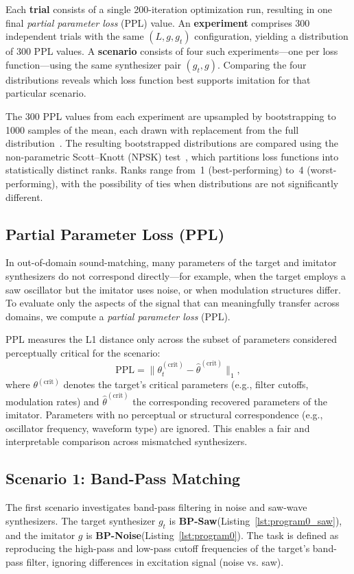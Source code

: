 \documentclass[14pt]{extarticle} %
\providecommand{\gls}[1]{#1}
\newcommand{\BPNoise}{\textbf{BP-Noise}\xspace}
\newcommand{\BPSaw}{\textbf{BP-Saw}\xspace}
\begin{document}
Each \textbf{trial} consists of a single 200-iteration optimization run, resulting in one final \textit{partial parameter loss} (PPL) value.  
An \textbf{experiment} comprises 300 independent trials with the same $(L, g, g_t)$ configuration, yielding a distribution of 300 PPL values.  
A \textbf{scenario} consists of four such experiments—one per loss function—using the same synthesizer pair $(g_t, g)$.  
Comparing the four distributions reveals which loss function best supports imitation for that particular scenario.

The 300 PPL values from each experiment are upsampled by bootstrapping to 1000 samples of the mean, each drawn with replacement from the full distribution~\cite{tibshirani1993introduction,chernick2011bootstrap}.  
The resulting bootstrapped distributions are compared using the non-parametric Scott–Knott (\gls{NPSK}) test~\cite{tantithamthavorn2017mvt,tantithamthavorn2018optimization}, which partitions loss functions into statistically distinct ranks.  
Ranks range from~1 (best-performing) to~4 (worst-performing), with the possibility of ties when distributions are not significantly different.

\subsection{Partial Parameter Loss (PPL)}
In out-of-domain sound-matching, many parameters of the target and imitator synthesizers do not correspond directly—for example, when the target employs a saw oscillator but the imitator uses noise, or when modulation structures differ.  
To evaluate only the aspects of the signal that can meaningfully transfer across domains, we compute a \emph{partial parameter loss} (PPL).  

PPL measures the L1 distance only across the subset of parameters considered perceptually critical for the scenario:
\begin{equation}
\mathrm{PPL} = \| \theta^{(\mathrm{crit})}_t - \hat{\theta}^{(\mathrm{crit})} \|_1,
\end{equation}
where $\theta^{(\mathrm{crit})}$ denotes the target’s critical parameters (e.g., filter cutoffs, modulation rates) and $\hat{\theta}^{(\mathrm{crit})}$ the corresponding recovered parameters of the imitator.  
Parameters with no perceptual or structural correspondence (e.g., oscillator frequency, waveform type) are ignored.  
This enables a fair and interpretable comparison across mismatched synthesizers.

\subsection{Scenario 1: Band-Pass Matching}
The first scenario investigates band-pass filtering in noise and saw-wave synthesizers.  
The target synthesizer $g_t$ is \BPSaw (Listing~\ref{lst:program0_saw}), and the imitator $g$ is \BPNoise (Listing~\ref{lst:program0}).  
The task is defined as reproducing the high-pass and low-pass cutoff frequencies of the target’s band-pass filter, ignoring differences in excitation signal (noise vs. saw).
\end{document}
